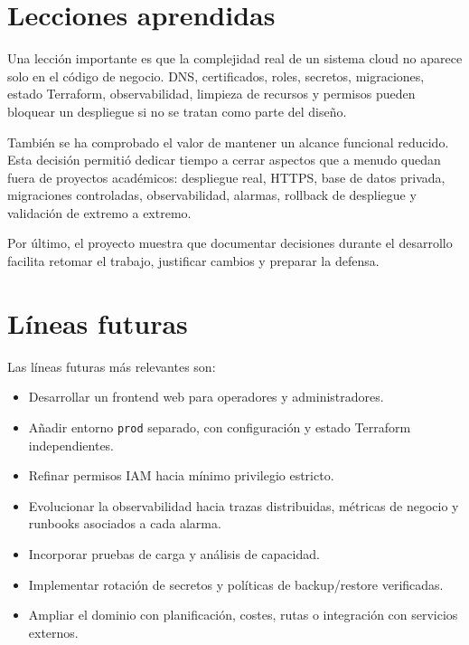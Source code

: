 \section{Lecciones aprendidas}
\label{sec:lecciones-aprendidas}

Una lección importante es que la complejidad real de un sistema cloud no aparece solo en el código de negocio. DNS, certificados, roles, secretos, migraciones, estado Terraform, observabilidad, limpieza de recursos y permisos pueden bloquear un despliegue si no se tratan como parte del diseño.

También se ha comprobado el valor de mantener un alcance funcional reducido. Esta decisión permitió dedicar tiempo a cerrar aspectos que a menudo quedan fuera de proyectos académicos: despliegue real, HTTPS, base de datos privada, migraciones controladas, observabilidad, alarmas, rollback de despliegue y validación de extremo a extremo.

Por último, el proyecto muestra que documentar decisiones durante el desarrollo facilita retomar el trabajo, justificar cambios y preparar la defensa.

\section{Líneas futuras}
\label{sec:lineas-futuras}

Las líneas futuras más relevantes son:

\begin{itemize}
  \item Desarrollar un frontend web para operadores y administradores.
  \item Añadir entorno \texttt{prod} separado, con configuración y estado Terraform independientes.
  \item Refinar permisos IAM hacia mínimo privilegio estricto.
  \item Evolucionar la observabilidad hacia trazas distribuidas, métricas de negocio y runbooks asociados a cada alarma.
  \item Incorporar pruebas de carga y análisis de capacidad.
  \item Implementar rotación de secretos y políticas de backup/restore verificadas.
  \item Ampliar el dominio con planificación, costes, rutas o integración con servicios externos.
\end{itemize}
